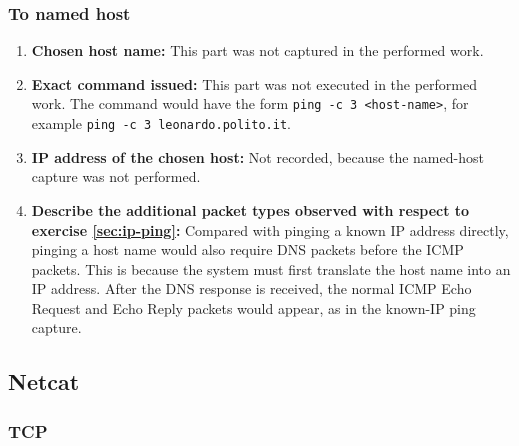 \documentclass{article}
\begin{document}
\subsubsection{To named host}

\begin{enumerate}
    \item \textbf{Chosen host name:} This part was not captured in the performed work.
    \item \textbf{Exact command issued:} This part was not executed in the performed work. The command would have the form \texttt{ping -c 3 <host-name>}, for example \texttt{ping -c 3 leonardo.polito.it}.
    \item \textbf{IP address of the chosen host:} Not recorded, because the named-host capture was not performed.
    \item \textbf{Describe the additional packet types observed with respect to exercise \ref{sec:ip-ping}:} Compared with pinging a known IP address directly, pinging a host name would also require DNS packets before the ICMP packets. This is because the system must first translate the host name into an IP address. After the DNS response is received, the normal ICMP Echo Request and Echo Reply packets would appear, as in the known-IP ping capture.
\end{enumerate}

\subsection{Netcat}

\subsubsection{TCP}
\end{document}
